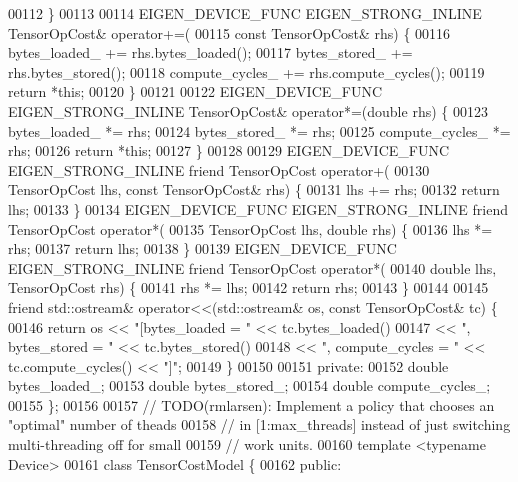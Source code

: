 \begin{DoxyCode}
00112   \}
00113 
00114   EIGEN\_DEVICE\_FUNC EIGEN\_STRONG\_INLINE TensorOpCost& operator+=(
00115       \textcolor{keyword}{const} TensorOpCost& rhs) \{
00116     bytes\_loaded\_ += rhs.bytes\_loaded();
00117     bytes\_stored\_ += rhs.bytes\_stored();
00118     compute\_cycles\_ += rhs.compute\_cycles();
00119     \textcolor{keywordflow}{return} *\textcolor{keyword}{this};
00120   \}
00121 
00122   EIGEN\_DEVICE\_FUNC EIGEN\_STRONG\_INLINE TensorOpCost& operator*=(\textcolor{keywordtype}{double} rhs) \{
00123     bytes\_loaded\_ *= rhs;
00124     bytes\_stored\_ *= rhs;
00125     compute\_cycles\_ *= rhs;
00126     \textcolor{keywordflow}{return} *\textcolor{keyword}{this};
00127   \}
00128 
00129   EIGEN\_DEVICE\_FUNC EIGEN\_STRONG\_INLINE \textcolor{keyword}{friend} TensorOpCost operator+(
00130       TensorOpCost lhs, \textcolor{keyword}{const} TensorOpCost& rhs) \{
00131     lhs += rhs;
00132     \textcolor{keywordflow}{return} lhs;
00133   \}
00134   EIGEN\_DEVICE\_FUNC EIGEN\_STRONG\_INLINE \textcolor{keyword}{friend} TensorOpCost operator*(
00135       TensorOpCost lhs, \textcolor{keywordtype}{double} rhs) \{
00136     lhs *= rhs;
00137     \textcolor{keywordflow}{return} lhs;
00138   \}
00139   EIGEN\_DEVICE\_FUNC EIGEN\_STRONG\_INLINE \textcolor{keyword}{friend} TensorOpCost operator*(
00140       \textcolor{keywordtype}{double} lhs, TensorOpCost rhs) \{
00141     rhs *= lhs;
00142     \textcolor{keywordflow}{return} rhs;
00143   \}
00144 
00145   \textcolor{keyword}{friend} std::ostream& operator<<(std::ostream& os, \textcolor{keyword}{const} TensorOpCost& tc) \{
00146     \textcolor{keywordflow}{return} os << \textcolor{stringliteral}{"[bytes\_loaded = "} << tc.bytes\_loaded()
00147               << \textcolor{stringliteral}{", bytes\_stored = "} << tc.bytes\_stored()
00148               << \textcolor{stringliteral}{", compute\_cycles = "} << tc.compute\_cycles() << \textcolor{stringliteral}{"]"};
00149   \}
00150 
00151  \textcolor{keyword}{private}:
00152   \textcolor{keywordtype}{double} bytes\_loaded\_;
00153   \textcolor{keywordtype}{double} bytes\_stored\_;
00154   \textcolor{keywordtype}{double} compute\_cycles\_;
00155 \};
00156 
00157 \textcolor{comment}{// TODO(rmlarsen): Implement a policy that chooses an "optimal" number of theads}
00158 \textcolor{comment}{// in [1:max\_threads] instead of just switching multi-threading off for small}
00159 \textcolor{comment}{// work units.}
00160 \textcolor{keyword}{template} <\textcolor{keyword}{typename} Device>
00161 \textcolor{keyword}{class }TensorCostModel \{
00162  \textcolor{keyword}{public}:

\end{DoxyCode}
